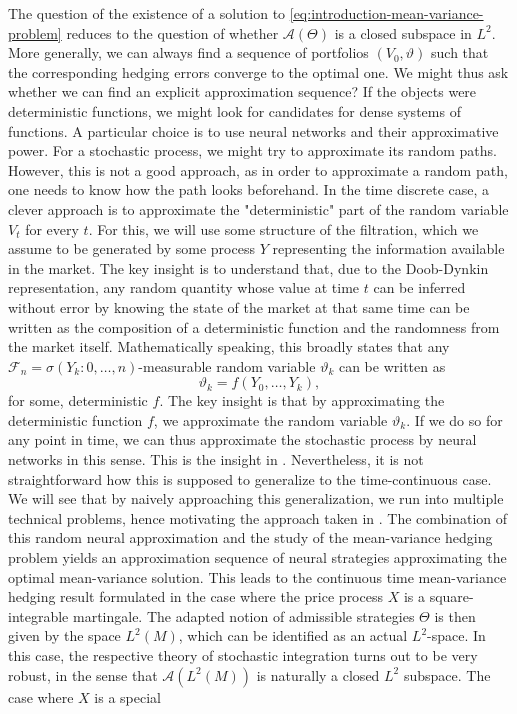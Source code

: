 \documentclass[11pt,a4paper,twoside,openany]{report}
\theoremstyle{plain} %
\theoremstyle{definition} %
\theoremstyle{remark} %
\let\parencite\authnumparencite
\begin{document}
The question of the existence of a solution to \cref{eq:introduction-mean-variance-problem} reduces to the question of whether \( \mathcal{A}(\Theta)\) is a closed subspace in \(L^2\). 
\bigbreak
More generally, we can always find a sequence of portfolios \((V_0,\vartheta)\) such that the corresponding hedging errors converge to the optimal one. We might thus ask whether we can find an explicit approximation sequence? If the objects were deterministic functions, we might look for candidates for dense systems of functions. A particular choice is to use neural networks and their approximative power. For a stochastic process, we might try to approximate its random paths. However, this is not a good approach, as in order to approximate a random path, one needs to know how the path looks beforehand. In the time discrete case, a clever approach is to approximate the "deterministic" part of the random variable \(V_t\) for every \(t\). For this, we will use some structure of the filtration, which we assume to be generated by some process \(Y\) representing the information available in the market. The key insight is to understand that, due to the Doob-Dynkin representation, any random quantity whose value at time \(t\) can be inferred without error by knowing the state of the market at that same time can be written as the composition of a deterministic function and the randomness from the market itself. Mathematically speaking, this broadly states that any \(\mathcal{F}_{n}=\sigma(Y_k:0,\dots,n)\)-measurable random variable \(\vartheta_k\) can be written as
\begin{equation}
    \vartheta_k = f(Y_0,\dots,Y_k),
\end{equation}
for some, deterministic \(f\).
The key insight is that by approximating the deterministic function \(f\), we approximate the random variable \(\vartheta_k\). If we do so for any point in time, we can thus approximate the stochastic process by neural networks in this sense. This is the insight in \parencite{Buehler2018DeepHedging}. Nevertheless, it is not straightforward how this is supposed to generalize to the time-continuous case. We will see that by naively approaching this generalization, we run into multiple technical problems, hence motivating the approach taken in \parencite{Arandjelovic2025}. 
\bigbreak
The combination of this random neural approximation and the study of the mean-variance hedging problem yields an approximation sequence of neural strategies approximating the optimal mean-variance solution. This leads to the continuous time mean-variance hedging result \parencite[Thm.~5.35]{Arandjelovic2025} formulated in the case where the price process \(X\) is a square-integrable martingale. The adapted notion of admissible strategies \(\Theta\) is then given by the space \(L^2(M)\), which can be identified as an actual \(L^2\)-space. In this case, the respective theory of stochastic integration turns out to be very robust, in the sense that \(\mathcal{A}(L^2(M))\) is naturally a closed \(L^2\) subspace. The case where \(X\) is a special
\end{document}
